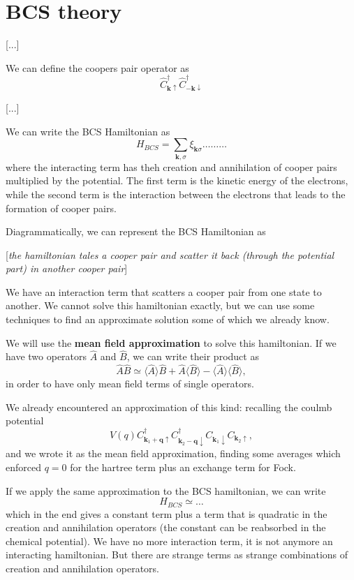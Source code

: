 \section{BCS theory}

 [...]

We can define the coopers pair operator as
\[
    \hat{C}_{\mathbf{k} \uparrow}^\dagger \hat{C}_{-\mathbf{k} \downarrow}^\dagger
\]

[...]

We can write the BCS Hamiltonian as
\[
    H_{BCS} = \sum_{\mathbf{k}, \sigma} \xi_{\mathbf{k}\sigma} \dots \dots \dots
\]
where the interacting term has theh creation and annihilation of cooper pairs multiplied by the potential. The first term is the kinetic energy of the electrons, while the second term is the interaction between the electrons that leads to the formation of cooper pairs.

Diagrammatically, we can represent the BCS Hamiltonian as

    [\textit{the hamiltonian tales a cooper pair and scatter it back (through the potential part) in another cooper pair}]

We have an interaction term that scatters a cooper pair from one state to another. We cannot solve this hamiltonian exactly, but we can use some techniques to find an approximate solution some of which we already know.

We will use the \textbf{mean field approximation} to solve this hamiltonian. If we have two operators \(\hat{A} \) and \(\hat{B} \), we can write their product as
\[
    \hat{A} \hat{B} \simeq \langle \hat{A} \rangle \hat{B} + \hat{A} \langle \hat{B} \rangle - \langle \hat{A} \rangle \langle \hat{B} \rangle,
\]
in order to have only mean field terms of single operators.

We already encountered an approximation of this kind: recalling the coulmb potential
\[
    V(q) C^\dagger_{\mathbf{k}_1+\mathbf{q} \uparrow} C^\dagger_{\mathbf{k}_2-\mathbf{q} \downarrow} C_{\mathbf{k}_1 \downarrow} C_{\mathbf{k}_2 \uparrow},
\]
and we wrote it as the mean field approximation, finding some averages which enforced \(q=0\) for the hartree term plus an exchange term for Fock.

If we apply the same approximation to the BCS hamiltonian, we can write
\[
    H_{BCS} \simeq \dots
\]
which in the end gives a constant term plus a term that is quadratic in the creation and annihilation operators (the constant can be reabsorbed in the chemical potential). We have no more interaction term, it is not anymore an interacting hamiltonian. But there are strange terms as strange combinations of creation and annihilation operators.

